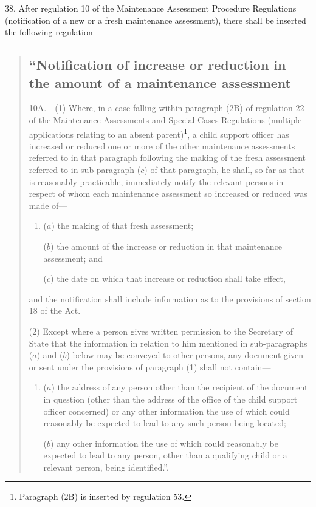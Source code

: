 \documentclass[12pt,a4paper]{article}
\begin{document}
38.  After regulation 10 of the Maintenance Assessment Procedure Regulations (notification of a new or a fresh maintenance assessment), there shall be inserted the following regulation—
\begin{quotation}
\subsection*{\sloppy “Notification of increase or reduction in the amount of a maintenance assessment}

10A.—(1) Where, in a case falling within paragraph (2B) of regulation 22 of the Maintenance Assessments and Special Cases Regulations (multiple applications relating to an absent parent)\footnote{\frenchspacing Paragraph (2B) is inserted by regulation 53.}, a child support officer has increased or reduced one or more of the other maintenance assessments referred to in that paragraph following the making of the fresh assessment referred to in sub-paragraph ($c$) of that paragraph, he shall, so far as that is reasonably practicable, immediately notify the relevant persons in respect of whom each maintenance assessment so increased or reduced was made of—
\begin{enumerate}\item[]
($a$) the making of that fresh assessment;

($b$) the amount of the increase or reduction in that maintenance assessment; and

($c$) the date on which that increase or reduction shall take effect,
\end{enumerate}
and the notification shall include information as to the provisions of section 18 of the Act.

(2) Except where a person gives written permission to the Secretary of State that the information in relation to him mentioned in sub-paragraphs ($a$) and ($b$) below may be conveyed to other persons, any document given or sent under the provisions of paragraph (1) shall not contain—
\begin{enumerate}\item[]
($a$) the address of any person other than the recipient of the document in question (other than the address of the office of the child support officer concerned) or any other information the use of which could reasonably be expected to lead to any such person being located;

($b$) any other information the use of which could reasonably be expected to lead to any person, other than a qualifying child or a relevant person, being identified.”.
\end{enumerate}
\end{quotation}
\end{document}
